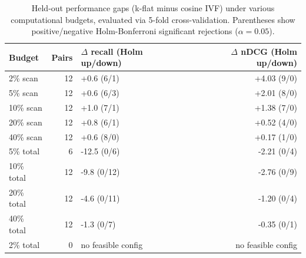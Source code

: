 \begin{table}[t]
\centering
\caption{Held-out performance gaps (k-flat minus cosine IVF) under various computational budgets, evaluated via 5-fold cross-validation. Parentheses show positive/negative Holm-Bonferroni significant rejections ($\alpha = 0.05$).}
\label{tab:matched}
\small
\begin{tabular}{lrlr}
\toprule
Budget & Pairs & $\Delta$ recall (Holm up/down) & $\Delta$ nDCG (Holm up/down) \\
\midrule
2\% scan & 12 & +0.6 (6/1) & +4.03 (9/0) \\
5\% scan & 12 & +0.6 (6/3) & +2.01 (8/0) \\
10\% scan & 12 & +1.0 (7/1) & +1.38 (7/0) \\
20\% scan & 12 & +0.8 (6/1) & +0.52 (4/0) \\
40\% scan & 12 & +0.6 (8/0) & +0.17 (1/0) \\
5\% total & 6 & -12.5 (0/6) & -2.21 (0/4) \\
10\% total & 12 & -9.8 (0/12) & -2.76 (0/9) \\
20\% total & 12 & -4.6 (0/11) & -1.20 (0/4) \\
40\% total & 12 & -1.3 (0/7) & -0.35 (0/1) \\
2\% total & 0 & no feasible config & no feasible config \\
\bottomrule
\end{tabular}
\end{table}
